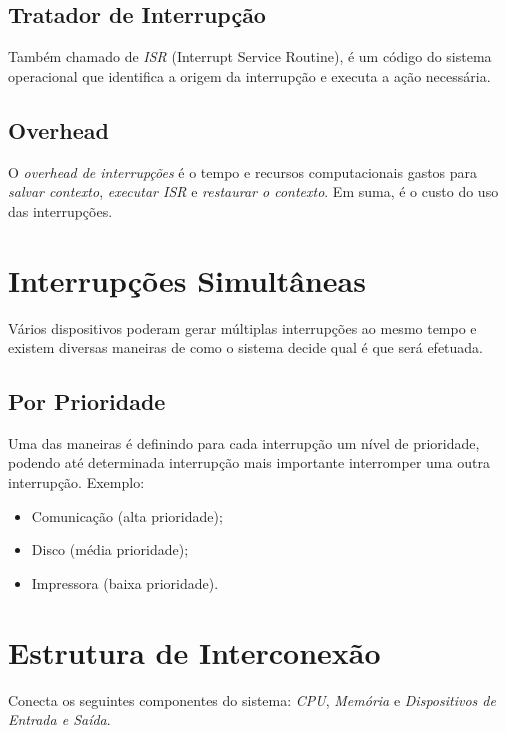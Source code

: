 \documentclass{article}
\begin{document}
\subsection{Tratador de Interrupção}
Também chamado de \emph{ISR} (Interrupt Service Routine), é um código do sistema operacional que identifica a origem da interrupção e executa a ação necessária.

\subsection{Overhead}
O \emph{overhead de interrupções} é o tempo e recursos computacionais gastos para \emph{salvar contexto}, \emph{executar ISR} e \emph{restaurar o contexto}. Em suma, é o custo do uso das interrupções.

\section{Interrupções Simultâneas}
Vários dispositivos poderam gerar múltiplas interrupções ao mesmo tempo e existem diversas maneiras de como o sistema decide qual é que será efetuada.

\subsection{Por Prioridade}
Uma das maneiras é definindo para cada interrupção um nível de prioridade, podendo até determinada interrupção mais importante interromper uma outra interrupção. Exemplo:
\begin{itemize}
    \item Comunicação (alta prioridade);
    \item Disco (média prioridade);
    \item Impressora (baixa prioridade).
\end{itemize}

\section{Estrutura de Interconexão}
Conecta os seguintes componentes do sistema: \emph{CPU}, \emph{Memória} e \emph{Dispositivos de Entrada e Saída}.
\end{document}

